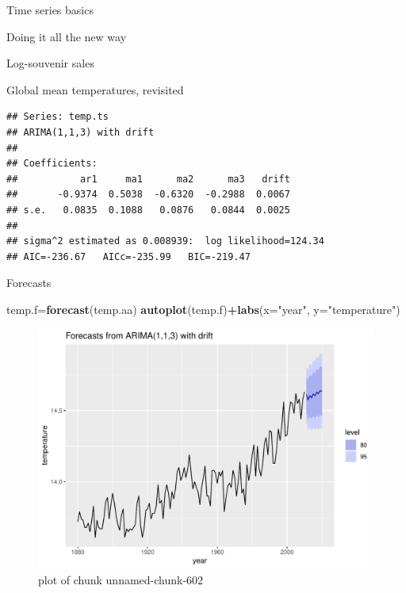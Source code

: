 \documentclass[ignorenonframetext,]{beamer}
\newenvironment{Shaded}{\begin{snugshade}}{\end{snugshade}}
\newcommand{\DataTypeTok}[1]{\textcolor[rgb]{0.13,0.29,0.53}{#1}}
\newcommand{\DecValTok}[1]{\textcolor[rgb]{0.00,0.00,0.81}{#1}}
\newcommand{\KeywordTok}[1]{\textcolor[rgb]{0.13,0.29,0.53}{\textbf{#1}}}
\newcommand{\NormalTok}[1]{#1}
\newcommand{\OperatorTok}[1]{\textcolor[rgb]{0.81,0.36,0.00}{\textbf{#1}}}
\newcommand{\StringTok}[1]{\textcolor[rgb]{0.31,0.60,0.02}{#1}}
\begin{document}
\begin{frame}[fragile]{Time series basics}
\begin{block}{Doing it all the new way}
\begin{block}{Log-souvenir sales}
\end{block}

\begin{block}{Global mean temperatures, revisited}

\begin{Shaded}
\end{Shaded}

\begin{verbatim}
## Series: temp.ts 
## ARIMA(1,1,3) with drift 
## 
## Coefficients:
##           ar1     ma1      ma2      ma3   drift
##       -0.9374  0.5038  -0.6320  -0.2988  0.0067
## s.e.   0.0835  0.1088   0.0876   0.0844  0.0025
## 
## sigma^2 estimated as 0.008939:  log likelihood=124.34
## AIC=-236.67   AICc=-235.99   BIC=-219.47
\end{verbatim}

Forecasts

\begin{Shaded}
\begin{Highlighting}[]
\NormalTok{temp.f=}\KeywordTok{forecast}\NormalTok{(temp.aa)}
\KeywordTok{autoplot}\NormalTok{(temp.f)}\OperatorTok{+}\KeywordTok{labs}\NormalTok{(}\DataTypeTok{x=}\StringTok{"year"}\NormalTok{, }\DataTypeTok{y=}\StringTok{"temperature"}\NormalTok{)}
\end{Highlighting}
\end{Shaded}

\begin{figure}
\centering
\includegraphics{figure/unnamed-chunk-602-1.pdf}
\caption{plot of chunk unnamed-chunk-602}
\end{figure}

\end{block}

\end{block}

\end{frame}
\end{document}
